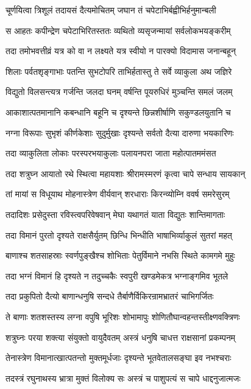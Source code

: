 \twolineshloka
{चूर्णयित्वा त्रिशूलं तदायसं दैत्यमोचितम्}
{जघान तं चपेटाभिर्बह्वीभिर्हनुमान्बली}%

\twolineshloka
{स आहतः कपीन्द्रेण चपेटाभिरितस्ततः}
{व्यथितो व्यसृजन्मायां सर्वलोकभयङ्करीम्}%

\twolineshloka
{तदा तमोभवत्तीव्रं यत्र को वा न लक्ष्यते}
{यत्र स्वीयो न पारक्यो विदामास जनान्बहून्}%

\twolineshloka
{शिलाः पर्वतशृङ्गाभाः पतन्ति सुभटोपरि}
{ताभिर्हतास्तु ते सर्वे व्याकुला अथ जज्ञिरे}%

\twolineshloka
{विद्युतो विलसन्त्यत्र गर्जन्ति जलदा घनम्}
{वर्षन्ति पूयरुधिरं मुञ्चन्ति समलं जलम्}%

\twolineshloka
{आकाशात्पतमानानि कबन्धानि बहूनि च}
{दृश्यन्ते छिन्नशीर्षाणि सकुण्डलयुतानि च}%

\twolineshloka
{नग्ना विरूपाः सुभृशं कीर्णकेशाः सुदुर्मुखाः}
{दृश्यन्ते सर्वतो दैत्या दारुणा भयकारिणः}%

\twolineshloka
{तदा व्याकुलिता लोकाः परस्परभयाकुलाः}
{पलायनपरा जाता महोत्पातममंसत}%

\twolineshloka
{तदा शत्रुघ्न आयातो रथे स्थित्वा महायशाः}
{श्रीरामस्मरणं कृत्वा चापे सन्धाय सायकान्}%

\twolineshloka
{तां मायां स विधूयाथ मोहनास्त्रेण वीर्यवान्}
{शरधाराः किरन्व्योम्नि ववर्ष समरेसुरम्}%

\twolineshloka
{तदादिशः प्रसेदुस्ता रविस्त्वपरिवेषवान्}
{मेघा यथागतं याता विद्युतः शान्तिमागताः}%

\twolineshloka
{तदा विमानं पुरतो दृश्यते राक्षसैर्युतम्}
{छिन्धि भिन्धीति भाषाभिर्व्याकुलं सुतरां महत्}%

\twolineshloka
{बाणाश्च शतसाहस्राः स्वर्णपुङ्खैश्च शोभिताः}
{पेतुर्विमाने नभसि स्थिते कामगमे मुहुः}%

\twolineshloka
{तदा भग्नं विमानं हि दृश्यते न तदुच्चकैः}
{स्वपुरी खण्डमेकत्र भग्नाङ्गमिव भूतले}%

\twolineshloka
{तदा प्रकुपितो दैत्यो बाणान्धनुषि सन्दधे}
{तैर्बाणैर्विकिरन्रामभ्रातरं चाभिगर्जितः}%

\twolineshloka
{ते बाणाः शतशस्तस्य लग्ना वपुषि भूरिशः}
{शोभामापुः शोणितौघान्वहन्तस्तीक्ष्णवक्त्रिणः}%

\twolineshloka
{शत्रुघ्नः परया शक्त्या संयुक्तो वायुदैवतम्}
{अस्त्रं धनुषि चाधत्त राक्षसानां प्रकम्पनम्}%

\twolineshloka
{तेनास्त्रेण विमानात्खात्पतन्तो मुक्तमूर्धजाः}
{दृश्यन्ते भूतवेतालसङ्घा इव नभश्चराः}%

\twolineshloka
{तदस्त्रं रघुनाथस्य भ्रात्रा मुक्तं विलोक्य सः}
{अस्त्रं च पाशुपत्यं स चापे धाद्दनुजात्मजः}%

